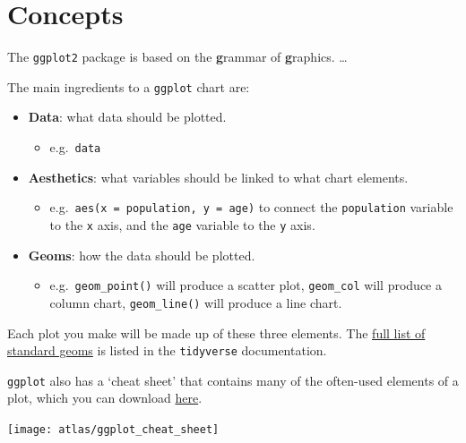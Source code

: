 \documentclass[
]{book}
\providecommand{\tightlist}{%
  \setlength{\itemsep}{0pt}\setlength{\parskip}{0pt}}
\begin{document}
\hypertarget{concepts}{%
\section{Concepts}\label{concepts}}

The \texttt{ggplot2} package is based on the \textbf{g}rammar of \textbf{g}raphics. \ldots{}

The main ingredients to a \texttt{ggplot} chart are:

\begin{itemize}
\tightlist
\item
  \textbf{Data}: what data should be plotted.

  \begin{itemize}
  \tightlist
  \item
    e.g.~\texttt{data}
  \end{itemize}
\item
  \textbf{Aesthetics}: what variables should be linked to what chart elements.

  \begin{itemize}
  \tightlist
  \item
    e.g.~\texttt{aes(x\ =\ population,\ y\ =\ age)} to connect the \texttt{population} variable to the \texttt{x} axis, and the \texttt{age} variable to the \texttt{y} axis.
  \end{itemize}
\item
  \textbf{Geoms}: how the data should be plotted.

  \begin{itemize}
  \tightlist
  \item
    e.g.~\texttt{geom\_point()} will produce a scatter plot, \texttt{geom\_col} will produce a column chart, \texttt{geom\_line()} will produce a line chart.
  \end{itemize}
\end{itemize}

Each plot you make will be made up of these three elements. The \href{https://ggplot2.tidyverse.org/reference/}{full list of standard geoms} is listed in the \texttt{tidyverse} documentation.

\texttt{ggplot} also has a `cheat sheet' that contains many of the often-used elements of a plot, which you can download \href{https://github.com/rstudio/cheatsheets/raw/master/data-visualization-2.1.pdf}{here}.

\begin{center}\texttt{[image: atlas/ggplot\_cheat\_sheet]} \end{center}
\end{document}
